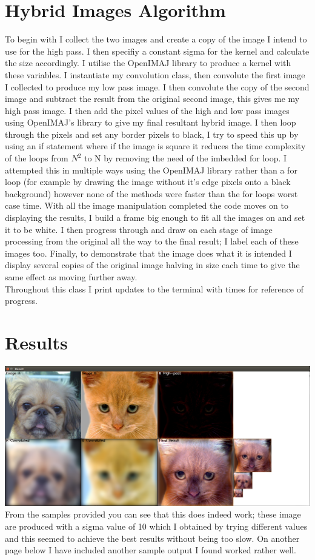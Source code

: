 \documentclass{article}
\begin{document}
	\section*{Hybrid Images Algorithm}
	To begin with I collect the two images and create a copy of the image I intend to use for the high pass. I then specifiy a constant sigma for the kernel and calculate the size accordingly. I utilise the OpenIMAJ library to produce a kernel with these variables. I instantiate my convolution class, then convolute the first image I collected to produce my low pass image. I then convolute the copy of the second image and subtract the result from the original second image, this gives me my high pass image. I then add the pixel values of the high and low pass images using OpenIMAJ’s library to give my final resultant hybrid image. I then loop through the pixels and set any border pixels to black, I try to speed this up by using an if statement where if the image is square it reduces the time complexity of the loops from $N^2$ to N by removing the need of the imbedded for loop. I attempted this in multiple ways using the OpenIMAJ library rather than a for loop (for example by drawing the image without it’s edge pixels onto a black background) however none of the methods were faster than the for loops worst case time.
	With all the image manipulation completed the code moves on to displaying the results, I build a frame big enough to fit all the images on and set it to be white. I then progress through and draw on each stage of image processing from the original all the way to the final result; I label each of these images too. Finally, to demonstrate that the image does what it is intended I display several copies of the original image halving in size each time to give the same effect as moving further away.\\
	Throughout this class I print updates to the terminal with times for reference of progress.
	
	\section*{Results}
	\includegraphics[scale=0.21]{hybrid_image}
	From the samples provided you can see that this does indeed work; these image are produced with a sigma value of 10 which I obtained by trying different values and this seemed to achieve the best results without being too slow. On another page below I have included another sample output I found worked rather well.
	
\end{document}
